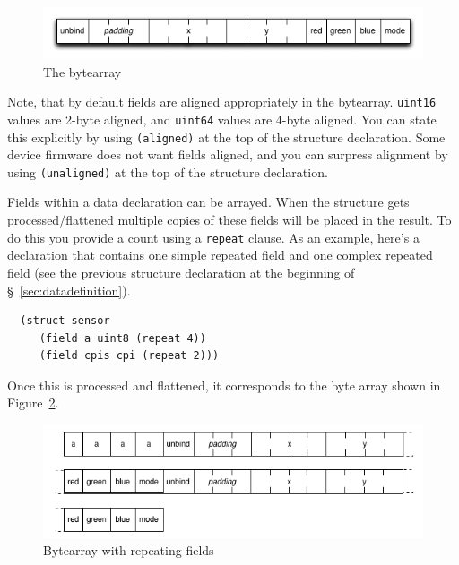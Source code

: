 \documentclass[12pt]{article}
\begin{document}
\begin{figure}[htbp] %
   \centering
   \includegraphics[width=6in]{bytearray.png} 
\caption{The bytearray}
\label{fig:bytearray}
\end{figure}

Note, that by default fields are aligned appropriately in the
bytearray. \verb|uint16| values are 2-byte aligned, and \verb|uint64|
values are 4-byte aligned. You can state this explicitly by using
\verb|(aligned)| at the top of the structure declaration. Some device
firmware does not want fields aligned, and you can surpress alignment
by using \verb|(unaligned)| at the top of the structure declaration. 

Fields within a data declaration can be arrayed. When the structure
gets processed/flattened multiple copies of these fields will be
placed in the result. To do this you provide a count using a
\verb|repeat| clause. As an example, here's a declaration that 
contains one simple repeated field and one complex repeated field 
(see the previous structure declaration at the beginning of
\S~\ref{sec:datadefinition}). 

\begin{verbatim}
  (struct sensor
     (field a uint8 (repeat 4))
     (field cpis cpi (repeat 2)))
\end{verbatim}

Once this is processed and flattened, it corresponds to the byte array
shown in Figure~\ref{fig:repeatingbytearray}.

\begin{figure}[htbp] %
   \centering
   \includegraphics[width=6in]{repeated_bytearray.png} 
\caption{Bytearray with repeating fields}
\label{fig:repeatingbytearray}
\end{figure}
\end{document}
